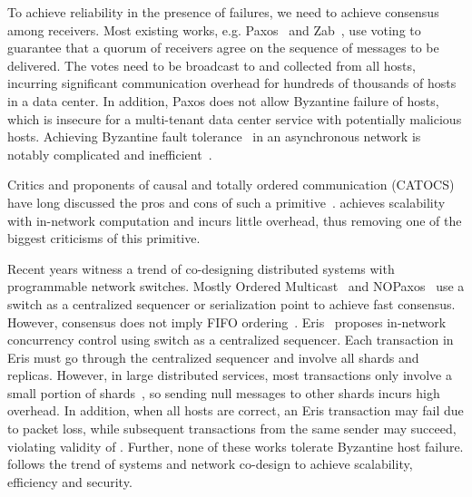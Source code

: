 To achieve reliability in the presence of failures, we need to achieve consensus among receivers.
Most existing works, e.g. Paxos~\cite{lamport1998part} and Zab~\cite{junqueira2011zab}, use voting to guarantee that a quorum of receivers agree on the sequence of messages to be delivered.
The votes need to be broadcast to and collected from all hosts, incurring significant communication overhead for hundreds of thousands of hosts in a data center.
In addition, Paxos does not allow Byzantine failure of hosts, which is insecure for a multi-tenant data center service with potentially malicious hosts.
Achieving Byzantine fault tolerance~\cite{lamport1982byzantine,castro1999practical,kotla2007zyzzyva} in an asynchronous network is notably complicated and inefficient~\cite{mickens2014saddest}.

Critics and proponents of causal and totally ordered communication (CATOCS) have long discussed the pros and cons of such a primitive~\cite{cheriton1994understanding,birman1994response,van1994bother}. 
\sys achieves scalability with in-network computation and incurs little overhead, thus removing one of the biggest criticisms of this primitive.

Recent years witness a trend of co-designing distributed systems with programmable network switches.
Mostly Ordered Multicast~\cite{ports2015designing} and NOPaxos~\cite{li2016just} use a switch as a centralized sequencer or serialization point to achieve fast consensus.
However, consensus does not imply FIFO ordering~\cite{junqueira2011zab}.
Eris~\cite{eris} proposes in-network concurrency control using switch as a centralized sequencer.
Each transaction in Eris must go through the centralized sequencer and involve all shards and replicas.
However, in large distributed services, most transactions only involve a small portion of shards~\cite{nishtala2013scaling}, so sending null messages to other shards incurs high overhead.
In addition, when all hosts are correct, an Eris transaction may fail due to packet loss, while subsequent transactions from the same sender may succeed, violating validity of \sys.
Further, none of these works tolerate Byzantine host failure.
\sys follows the trend of systems and network co-design to achieve scalability, efficiency and security.

\fi


